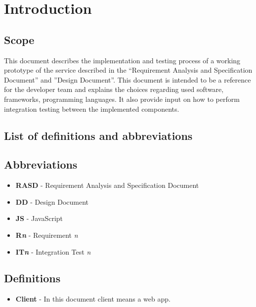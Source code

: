 \documentclass[
]{article}
\providecommand{\tightlist}{%
  \setlength{\itemsep}{0pt}\setlength{\parskip}{0pt}}
\begin{document}
\hypertarget{introduction}{%
\section{Introduction}\label{introduction}}

\hypertarget{scope}{%
\subsection{Scope}\label{scope}}

This document describes the implementation and testing process of a
working prototype of the service described in the ``Requirement Analysis
and Specification Document'' and ''Design Document''. This document is
intended to be a reference for the developer team and explains the
choices regarding used software, frameworks, programming languages. It
also provide input on how to perform integration testing between the
implemented components.

\hypertarget{list-of-definitions-and-abbreviations}{%
\subsection{List of definitions and
abbreviations}\label{list-of-definitions-and-abbreviations}}

\hypertarget{abbreviations}{%
\subsection{Abbreviations}\label{abbreviations}}

\begin{itemize}
\item
  \textbf{RASD} - Requirement Analysis and Specification Document
\item
  \textbf{DD} - Design Document
\item
  \textbf{JS} - JavaScript
\item
  \textbf{R\emph{n}} - Requirement \emph{n}
\item
  \textbf{IT\emph{n}} - Integration Test \emph{n}
\end{itemize}

\hypertarget{definitions}{%
\subsection{Definitions}\label{definitions}}

\begin{itemize}
\tightlist
\item
  \textbf{Client} - In this document client means a web app.
\end{itemize}
\end{document}
